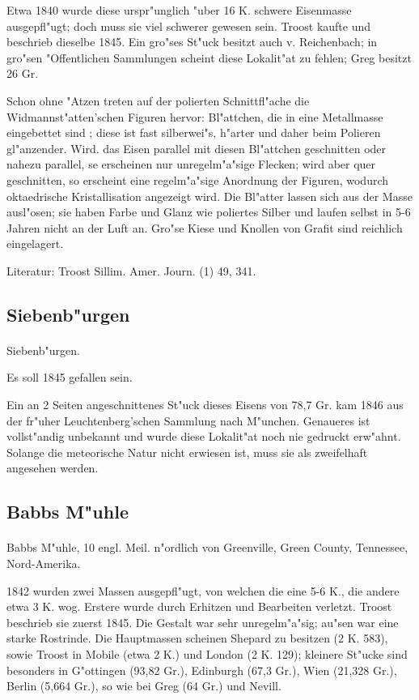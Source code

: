\documentclass[a4paper, 11pt, oneside]{article}
\begin{document}
Etwa 1840 wurde diese urspr"unglich "uber 16 K. schwere Eisenmasse ausgepfl"ugt; doch muss sie viel schwerer gewesen sein. Troost kaufte und beschrieb dieselbe 1845. Ein gro"ses St"uck besitzt auch v. Reichenbach; in gro"sen "Offentlichen Sammlungen scheint diese Lokalit"at zu fehlen; Greg besitzt 26 Gr.

Schon ohne "Atzen treten auf der polierten Schnittfl"ache die Widmannst"atten'schen Figuren hervor: Bl"attchen, die in eine Metallmasse eingebettet sind ; diese ist fast silberwei"s, h"arter und daher beim Polieren gl"anzender. Wird. das Eisen parallel mit diesen Bl"attchen geschnitten oder nahezu parallel, se erscheinen nur unregelm"a"sige Flecken; wird aber quer geschnitten, so erscheint eine regelm"a"sige Anordnung der Figuren, wodurch oktaedrische Kristallisation angezeigt wird. Die Bl"atter lassen sich aus der Masse ausl"osen; sie haben Farbe und Glanz wie poliertes Silber und laufen selbst in 5-6 Jahren nicht an der Luft an. Gro"se Kiese und Knollen von Grafit sind reichlich eingelagert.

\footnotesize
Literatur: Troost Sillim. Amer. Journ. (1) 49, 341.

\subsection{Siebenb"urgen}
\normalsize
\paragraph{}
Siebenb"urgen.

Es soll 1845 gefallen sein.

Ein an 2 Seiten angeschnittenes St"uck dieses Eisens von 78,7 Gr. kam 1846 aus der fr"uher Leuchtenberg'schen Sammlung nach M"unchen. Genaueres ist vollst"andig unbekannt und wurde diese Lokalit"at noch nie gedruckt erw"ahnt. Solange die meteorische Natur nicht erwiesen ist, muss sie als zweifelhaft angesehen werden.

\subsection{Babbs M"uhle}
\paragraph{}
Babbs M"uhle, 10 engl. Meil. n"ordlich von Greenville, Green County, Tennessee, Nord-Amerika.

1842 wurden zwei Massen ausgepfl"ugt, von welchen die eine 5-6 K., die andere etwa 3 K. wog. Erstere wurde durch Erhitzen und Bearbeiten verletzt. Troost beschrieb sie zuerst 1845. Die Gestalt war sehr unregelm"a"sig; au"sen war eine starke Rostrinde. Die Hauptmassen scheinen Shepard zu besitzen (2 K. 583), sowie Troost in Mobile (etwa 2 K.) und London (2 K. 129); kleinere St"ucke sind besonders in G"ottingen (93,82 Gr.), Edinburgh (67,3 Gr.), Wien (21,328 Gr.), Berlin (5,664 Gr.), so wie bei Greg (64 Gr.) und Nevill.
\end{document}
